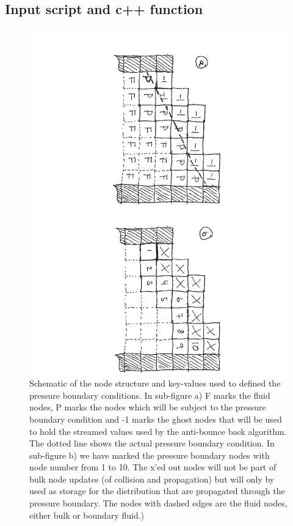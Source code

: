 \documentclass[11pt,a4paper]{report}
\begin{document}
\subsection{Input script and c++ function}
\begin{figure}
	\centering
	\includegraphics[angle=90,width=0.9\linewidth]{Figures/pressure_boundary01.png}
	\caption{Schematic of the node structure and key-values used to defined the pressure boundary conditions. In sub-figure a) F marks the fluid nodes, P marks the nodes which will be subject to the pressure boundary condition and -1 marks the ghost nodes that will be used to hold the streamed values used by the anti-bounce back algorithm. The dotted line shows the actual pressure boundary condition. In sub-figure b) we have marked the pressure boundary nodes with node number from 1 to 10. The x'ed out nodes will not be part of bulk node updates (of collision and propagation) but will only by used as storage for the distribution that are propagated through the pressure boundary. The nodes with dashed edges are the fluid nodes, either bulk or boundary fluid.)}
	\label{fig:pressure_boundary01}
\end{figure} 
\end{document}
